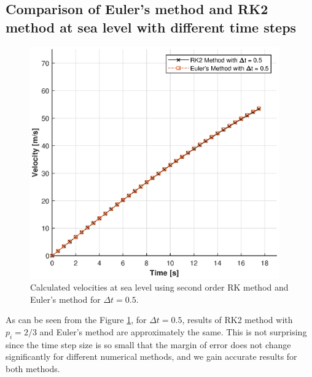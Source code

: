 \documentclass[letterpaper,12pt]{article}
\begin{document}
\subsection{Comparison of Euler's method and RK2 method at sea level with different time steps}
\begin{figure}[ht]
        \centering \includegraphics[max height=10cm]{graphs/compare05.eps}
        \caption{Calculated velocities at sea level using second order RK method and Euler's method for $\Delta t=0.5$.}
        \label{fig:rk2_05}
\end{figure}
As can be seen from the Figure \ref{fig:rk2_05}, for $\Delta t = 0.5$, results of RK2 method with $p_i=2/3$ and Euler's method
are approximately the same. This is not surprising since the time step size is so small that the margin of error does not change
significantly for different numerical methods, and we gain accurate results for both methods.
\newpage
\end{document}
